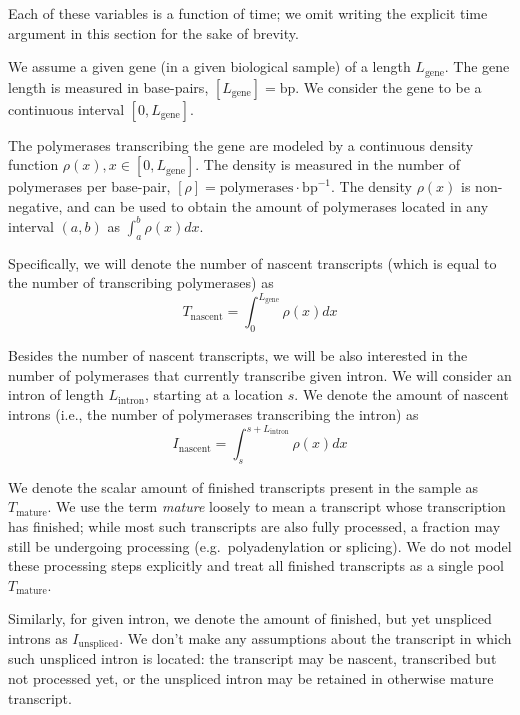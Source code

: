 \documentclass[11pt]{article}
\begin{document}
    Each of these variables is a function of time; we omit writing the explicit time argument in this section for the sake of brevity.

    We assume a given gene (in a given biological sample) of a length $L_{\mathrm{gene}}$. The gene length is measured in base-pairs, $\left[ L_{\mathrm{gene}} \right]= \mathrm{bp}$. We consider the gene to be a continuous interval $\left[0, L_{\mathrm{gene}} \right]$.

    The polymerases transcribing the gene are modeled by a continuous density function $\rho(x), x \in \left[0, L_{\mathrm{gene}} \right]$. The density is measured in the number of polymerases per base-pair, $[\rho] = \mathrm{polymerases}\cdot\mathrm{bp}^{-1}$. The density $\rho(x)$ is non-negative, and can be used to obtain the amount of polymerases located in any interval $(a,b)$ as $\int_{a}^{b} \rho(x) dx$.

    Specifically, we will denote the number of nascent transcripts (which is equal to the number of transcribing polymerases) as
    \begin{equation} \label{eq:t_nascent_def}
    T_{\mathrm{nascent}} = \int_{0}^{L_{\mathrm{gene}}} \rho(x) dx
    \end{equation}

    Besides the number of nascent transcripts, we will be also interested in the number of polymerases that currently transcribe given intron. We will consider an intron of length $L_{\mathrm{intron}}$, starting at a location $s$. We denote the amount of nascent introns (i.e., the number of polymerases transcribing the intron) as
    \begin{equation} \label{eq:i_nascent_def}
    I_{\mathrm{nascent}} = \int_{s}^{s+L_{\mathrm{intron}}} \rho(x) dx
    \end{equation}

    We denote the scalar amount of finished transcripts present in the sample as  $T_{\mathrm{mature}}$. We use the term \textit{mature} loosely to mean a transcript whose transcription has finished; while most such transcripts are also fully processed, a fraction may still be undergoing processing (e.g.\ polyadenylation or splicing). We do not model these processing steps explicitly and treat all finished transcripts as a single pool $T_{\mathrm{mature}}$.

    Similarly, for given intron, we denote the amount of finished, but yet unspliced introns as $I_{\mathrm{unspliced}}$. We don't make any assumptions about the transcript in which such unspliced intron is located: the transcript may be nascent, transcribed but not processed yet, or the unspliced intron may be retained in otherwise mature transcript.
\end{document}
